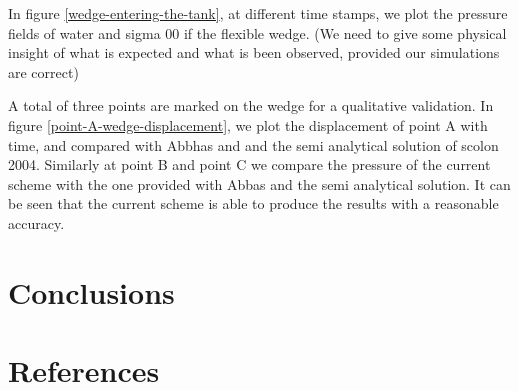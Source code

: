 \documentclass[preprint,12pt]{elsarticle}
\begin{document}
In figure \ref{wedge-entering-the-tank}, at different time stamps, we plot the
pressure fields of water and sigma 00 if the flexible wedge. (We need to give
some physical insight of what is expected and what is been observed, provided
our simulations are correct)



A total of three points are marked on the wedge for a qualitative validation.
In figure \ref{point-A-wedge-displacement}, we plot the displacement of point
A with time, and compared with Abbhas and and the semi analytical solution of
scolon 2004. Similarly at point B and point C we compare the pressure of the
current scheme with the one provided with Abbas and the semi analytical
solution. It can be seen that the current scheme is able to produce the
results with a reasonable accuracy.




\section{Conclusions}
\label{sec:conclusions}


\section*{References}


\end{document}
